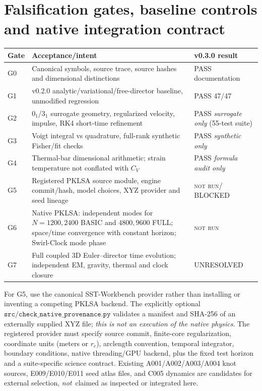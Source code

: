 \documentclass[11pt,a4paper]{article}
\newcommand{\NotRun}{\textsc{not run}}
\begin{document}
\section{Falsification gates, baseline controls and native integration contract}
\begin{longtable}{p{.08\linewidth}p{.57\linewidth}p{.27\linewidth}}\toprule Gate&Acceptance/intent&v0.3.0 result\\\midrule\endhead
G0 & Canonical symbols, source trace, source hashes and dimensional distinctions & PASS documentation \\
G1 & v0.2.0 analytic/variational/free-director baseline, unmodified regression & PASS 47/47 \\
G2 & $0_1$/$3_1$ surrogate geometry, regularized velocity, impulse, RK4 short-time refinement & PASS \emph{surrogate only} (55-test suite) \\
G3 & Voigt integral vs quadrature, full-rank synthetic Fisher/fit checks & PASS \emph{synthetic only} \\
G4 & Thermal-bar dimensional arithmetic; strain temperature not conflated with $C_V$ & PASS \emph{formula audit only} \\
G5 & Registered PKLSA source module, engine commit/hash, model choices, XYZ provider and seed lineage & \NotRun / BLOCKED \\
G6 & Native PKLSA: independent modes for $N=1200,2400$ BASIC and $4800,9600$ FULL; space/time convergence with constant horizon; Swirl-Clock mode phase & \NotRun \\
G7 & Full coupled 3D Euler--director time evolution; independent EM, gravity, thermal and clock closure & UNRESOLVED\\\bottomrule\end{longtable}

For G5, use the canonical SST-Workbench provider rather than installing or inventing a competing PKLSA backend. The explicitly optional $\texttt{src/check\_native\_provenance.py}$ validates a manifest and SHA-256 of an externally supplied XYZ file; \emph{this is not an execution of the native physics}. The registered provider must specify source commit, finite-core regularization, coordinate units (meters or $r_c$), arclength convention, temporal integrator, boundary conditions, native threading/GPU backend, plus the fixed test horizon and a suite-specific science contract. Existing A001/A002/A003/A004 knot sources, E009/E010/E011 seed atlas files, and C005 dynamics are candidates for external selection, \emph{not}\, claimed as inspected or integrated here.
\end{document}
